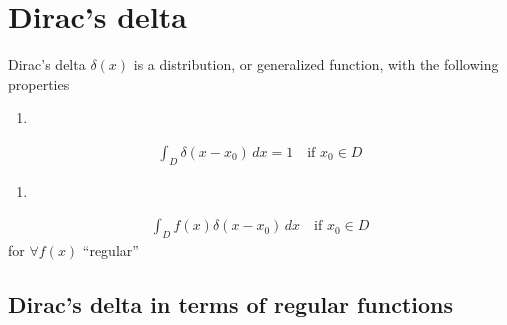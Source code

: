 \documentclass[letterpaper,10pt,english]{jupyterBook}
\begin{document}
\chapter{Dirac’s delta}
\label{\detokenize{ch/functional-analysis/dirac-delta:dirac-s-delta}}\label{\detokenize{ch/functional-analysis/dirac-delta:functional-analysis-dirac-delta}}\label{\detokenize{ch/functional-analysis/dirac-delta::doc}}
\sphinxAtStartPar
Dirac’s delta \(\delta(x)\) is a distribution, or generalized function, with the following properties
\begin{enumerate}
%
\item {} 
\end{enumerate}
\begin{equation}\label{equation:ch/functional-analysis/dirac-delta:dirac-delta:prop-1}
\begin{split}\int_{D} \delta(x-x_0) \, dx = 1  \quad \text{if $x_0 \in D$}\end{split}
\end{equation}\begin{enumerate}
%
\setcounter{enumi}{1}
\item {} 
\end{enumerate}
\begin{equation}\label{equation:ch/functional-analysis/dirac-delta:dirac-delta:prop-2}
\begin{split}\int_{D} f(x) \delta(x-x_0) \, dx \quad \text{if $x_0 \in D$}\end{split}
\end{equation}
\sphinxAtStartPar
for \(\forall f(x)\) “regular”  


\section{Dirac’s delta in terms of regular functions}
\label{\detokenize{ch/functional-analysis/dirac-delta:dirac-s-delta-in-terms-of-regular-functions}}\label{\detokenize{ch/functional-analysis/dirac-delta:functional-analysis-dirac-delta-approximations}}
\end{document}
